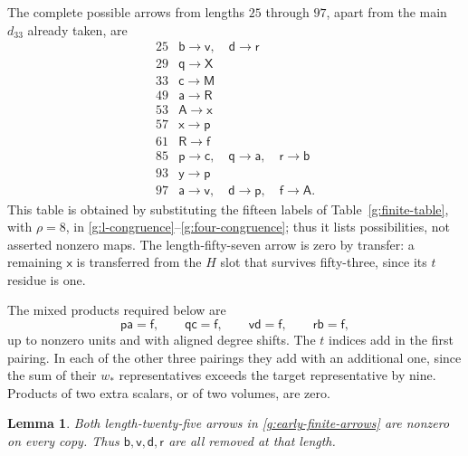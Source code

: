 \documentclass[11pt]{article}
\newtheorem{lemma}[theorem]{Lemma}
\theoremstyle{definition}
\theoremstyle{remark}
\numberwithin{equation}{section}
\begin{document}
The complete possible arrows from lengths $25$ through
$97$, apart from the main $d_{33}$ already taken, are
\begin{equation}\label{g:early-finite-arrows}
\begin{array}{c|l}
25&\mathsf b\longrightarrow\mathsf v,\quad
    \mathsf d\longrightarrow\mathsf r\\
29&\mathsf q\longrightarrow\mathsf X\\
33&\mathsf c\longrightarrow\mathsf M\\
49&\mathsf a\longrightarrow\mathsf R\\
53&\mathsf A\longrightarrow\mathsf x\\
57&\mathsf x\longrightarrow\mathsf p\\
61&\mathsf R\longrightarrow\mathsf f\\
85&\mathsf p\longrightarrow\mathsf c,\quad
    \mathsf q\longrightarrow\mathsf a,\quad
    \mathsf r\longrightarrow\mathsf b\\
93&\mathsf y\longrightarrow\mathsf p\\
97&\mathsf a\longrightarrow\mathsf v,\quad
    \mathsf d\longrightarrow\mathsf p,\quad
    \mathsf f\longrightarrow\mathsf A.
\end{array}
\end{equation}
This table is obtained by substituting the fifteen labels
of Table~\ref{g:finite-table}, with $\rho=8$, in
\eqref{g:l-congruence}--\eqref{g:four-congruence}; thus
it lists possibilities, not asserted nonzero maps.
The length-fifty-seven arrow is zero by transfer: a
remaining $\mathsf x$ is transferred from the $H$ slot
that survives fifty-three, since its $t$ residue is one.

The mixed products required below are
\begin{equation}\label{g:finite-products}
 \mathsf p\mathsf a=\mathsf f,\qquad
 \mathsf q\mathsf c=\mathsf f,\qquad
 \mathsf v\mathsf d=\mathsf f,\qquad
 \mathsf r\mathsf b=\mathsf f,
\end{equation}
up to nonzero units and with aligned degree shifts.
The $t$ indices add in the first pairing.  In each of
the other three pairings they add with an additional
one, since the sum of their $w_*$ representatives
exceeds the target representative by nine.  Products
of two extra scalars, or of two volumes, are zero.

\begin{lemma}\label{g:d25-nonzero}
Both length-twenty-five arrows in
\eqref{g:early-finite-arrows} are nonzero on every
copy.  Thus $\mathsf b,\mathsf v,\mathsf d,\mathsf r$
are all removed at that length.
\end{lemma}
\end{document}
